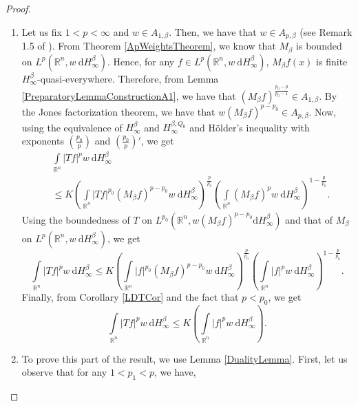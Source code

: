 \documentclass{amsart}
\numberwithin{theorem}{section}
\numberwithin{equation}{section}
\begin{document}
		\begin{proof}~
			\begin{enumerate}
				\item[(A)] Let us fix $1 < p < \infty$ and $w \in A_{1, \beta}$. Then, we have that $w \in A_{p, \beta}$ (see Remark 1.5 of \cite{Huang}). From Theorem \ref{ApWeightsTheorem}, we know that $M_{\beta}$ is bounded on $L^p \left( \mathbb{R}^n, w \ \mathrm{d}H^{\beta}_{\infty} \right)$. Hence, for any $f \in L^p \left( \mathbb{R}^n, w \ \mathrm{d}H^{\beta}_{\infty} \right)$, $M_{\beta} f \left( x \right)$ is finite $H^{\beta}_{\infty}$-quasi-everywhere. Therefore, from Lemma \ref{PreparatoryLemmaConstructionA1}, we have that $\left( M_{\beta}f \right)^{\frac{p_0 - p}{p_0 - 1}} \in A_{1, \beta}$. By the Jones factorization theorem, we have that $w \left( M_{\beta}f \right)^{p - p_0} \in A_{p, \beta}$. Now, using the equivalence of $H^{\beta}_{\infty}$ and $H^{\beta, Q_0}_{\infty}$ and H\"{o}lder's inequality with exponents $\left( \frac{p_0}{p} \right)$ and $\left( \frac{p_0}{p} \right)'$, we get
				\begin{align*}
					&\int\limits_{\mathbb{R}^n} \left| Tf \right|^p w \ \mathrm{d}H^{\beta}_{\infty} \\
					&\leq K \left( \int\limits_{\mathbb{R}^n} \left| Tf \right|^{p_0} \left( M_{\beta}f \right)^{p - p_0} w \ \mathrm{d}H^{\beta}_{\infty} \right)^{\frac{p}{p_0}} \left( \int\limits_{\mathbb{R}^n} \left( M_{\beta}f \right)^p w \ \mathrm{d}H^{\beta}_{\infty} \right)^{1 - \frac{p}{p_0}}.
				\end{align*}
				Using the boundedness of $T$ on $L^{p_0} \left( \mathbb{R}^n, w \left( M_{\beta}f \right)^{p - p_0} \mathrm{d}H^{\beta}_{\infty} \right)$ and that of $M_{\beta}$ on $L^p \left( \mathbb{R}^n, w \ \mathrm{d}H^{\beta}_{\infty} \right)$, we get
				$$\int\limits_{\mathbb{R}^n} \left| Tf \right|^p w \ \mathrm{d}H^{\beta}_{\infty} \leq K \left( \int\limits_{\mathbb{R}^n} \left| f \right|^{p_0} \left( M_{\beta}f \right)^{p - p_0} w \ \mathrm{d}H^{\beta}_{\infty} \right)^{\frac{p}{p_0}} \left( \int\limits_{\mathbb{R}^n} \left| f \right|^p w \ \mathrm{d}H^{\beta}_{\infty} \right)^{1 - \frac{p}{p_0}}.$$
				Finally, from Corollary \ref{LDTCor} and the fact that $p < p_0$, we get
				$$\int\limits_{\mathbb{R}^n} \left| Tf \right|^p w \ \mathrm{d}H^{\beta}_{\infty} \leq K \left( \int\limits_{\mathbb{R}^n} \left| f \right|^p w \ \mathrm{d}H^{\beta}_{\infty} \right).$$
				\item[(B)] To prove this part of the result, we use Lemma \ref{DualityLemma}. First, let us observe that for any $1 < p_1 < p$, we have,

\end{enumerate}
\end{proof}
\end{document}
